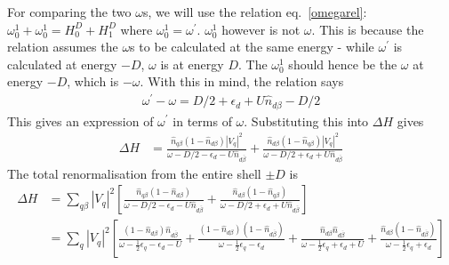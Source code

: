 For comparing the two \(\omega\)s, we will use the relation eq.~\ref{omegarel}: \(\omega_0^1 + \omega^1_0 = H^D_0 + H^D_1\) where \(\omega_0^1 = \omega^\prime\). \(\omega^1_0\) however is not \(\omega\). This is because the relation assumes the \(\omega\)s to be calculated at the same energy - while \(\omega^\prime\) is calculated at energy \(-D\), \(\omega\) is at energy \(D\). The \(\omega_0^1\) should hence be the \(\omega\) at energy \(-D\), which is \(-\omega\). With this in mind, the relation says
\begin{equation}\begin{aligned}
	\omega^\prime - \omega = D/2 + \epsilon_d + U \hat n_{d\beta} - D/2 
\end{aligned}\end{equation}
This gives an expression of \(\omega^\prime\) in terms of \(\omega\). Substituting this into \(\Delta H\)  gives
\begin{equation}\begin{aligned}
	\Delta H &=  \frac{\hat n_{q\beta}\left( 1 - \hat n_{d\beta} \right) |V_q|^2}{\omega - D/2 - \epsilon_d - U \hat n_{d\bar\beta}} + \frac{\hat n_{d\beta}\left( 1 - \hat n_{q\beta}\right)|V_q|^2}{\omega - D/2 +\epsilon_d + U \hat n_{d\bar\beta}}
\end{aligned}\end{equation}
The total renormalisation from the entire shell \(\pm D\) is
\begin{equation}\begin{aligned}
	\label{vanilla:siam:ren}
	\Delta H &=  \sum_{q\beta}|V_q|^2\left[\frac{\hat n_{q\beta}\left( 1 - \hat n_{d\beta} \right) }{\omega - D/2 - \epsilon_d - U \hat n_{d\bar\beta}} + \frac{\hat n_{d\beta}\left( 1 - \hat n_{q\beta}\right)}{\omega - D/2 +\epsilon_d + U \hat n_{d\bar\beta}}\right] \\
		 &= \sum_q |V_q|^2 \left[\frac{\left(1 - \hat n_{d\beta}\right)\hat n_{d\overline\beta}}{\omega - \frac{1}{2}\epsilon_q - \epsilon_d - U} + \frac{\left(1 - \hat n_{d\beta}\right)\left( 1-\hat n_{d\overline\beta} \right)}{\omega - \frac{1}{2}\epsilon_q - \epsilon_d} + \frac{\hat n_{d\beta} \hat n_{d\overline\beta}}{\omega - \frac{1}{2}\epsilon_q + \epsilon_d + U} + \frac{\hat n_{d\beta}\left( 1- \hat n_{d\overline\beta}\right) }{\omega - \frac{1}{2}\epsilon_q + \epsilon_d}\right]
\end{aligned}\end{equation}
